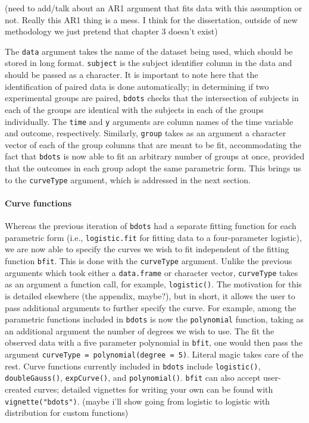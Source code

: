 \documentclass{article}
\newcommand{\xt}{\texttt}%
\begin{document}
(need to add/talk about an AR1 argument that fits data with this assumption or not. Really this AR1 thing is a mess. I think for the dissertation, outside of new methodology we just pretend that chapter 3 doesn't exist)

The \xt{data} argument takes the name of the dataset being used, which should be stored in long format. \xt{subject} is the subject identifier column in the data and should be passed as a character. It is important to note here that the identification of paired data is done automatically; in determining if two experimental groups are paired, \xt{bdots} checks that the intersection of subjects in each of the groups are identical with the subjects in each of the groups individually. The \xt{time} and \xt{y} arguments are column names of the time variable and outcome, respectively. Similarly, \xt{group} takes as an argument a character vector of each of the group columns that are meant to be fit, accommodating the fact that \xt{bdots} is now able to fit an arbitrary number of groups at once, provided that the outcomes in each group adopt the same parametric form. This brings us to the \xt{curveType} argument, which is addressed in the next section.


\paragraph{Curve functions} Whereas the previous iteration of \xt{bdots} had a separate fitting function for each parametric form (i.e., \xt{logistic.fit} for fitting data to a four-parameter logistic), we are now able to specify the curves we wish to fit independent of the fitting function \xt{bfit}. This is done with the \xt{curveType} argument. Unlike the previous arguments which took either a \xt{data.frame} or character  vector, \xt{curveType} takes as an argument a function call, for example, \xt{logistic()}. The motivation for this is detailed elsewhere (the appendix, maybe?), but in short, it allows the user to pass additional arguments to further specify the curve. For example, among the parametric functions included in \xt{bdots} is now the \xt{polynomial} function, taking as an additional argument the number of degrees we wish to use. The fit the observed data with a five parameter polynomial in \xt{bfit}, one would then pass the argument \xt{curveType = polynomial(degree = 5)}. Literal magic takes care of the rest. Curve functions currently included in \xt{bdots} include \xt{logistic()}, \xt{doubleGauss()}, \xt{expCurve()}, and \xt{polynomial()}. \xt{bfit} can also accept user-created curves; detailed vignettes for writing your own can be found with \xt{vignette("bdots")}. (maybe i'll show going from logistic to logistic with distribution for custom functions)
\end{document}
